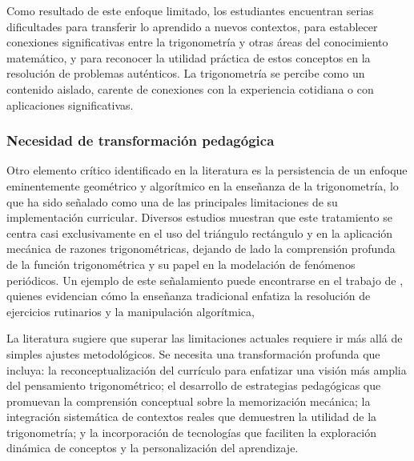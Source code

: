 Como resultado de este enfoque limitado, los estudiantes encuentran serias dificultades para transferir lo aprendido a nuevos contextos, para establecer conexiones significativas entre la trigonometría y otras áreas del conocimiento matemático, y para reconocer la utilidad práctica de estos conceptos en la resolución de problemas auténticos. La trigonometría se percibe como un contenido aislado, carente de conexiones con la experiencia cotidiana o con aplicaciones significativas.

\subsubsection{Necesidad de transformación pedagógica}
Otro elemento crítico identificado en la literatura es la persistencia de un enfoque eminentemente geométrico y algorítmico en la enseñanza de la trigonometría, lo que ha sido señalado como una de las principales limitaciones de su implementación curricular. Diversos estudios muestran que este tratamiento se centra casi exclusivamente en el uso del triángulo rectángulo y en la aplicación mecánica de razones trigonométricas, dejando de lado la comprensión profunda de la función trigonométrica y su papel en la modelación de fenómenos periódicos. Un ejemplo de este señalamiento puede encontrarse en el trabajo de \textcite{chavezEstrategiasDidacticasMediadas2022}, quienes evidencian cómo la enseñanza tradicional enfatiza la resolución de ejercicios rutinarios y la manipulación algorítmica,


La literatura sugiere que superar las limitaciones actuales requiere ir más allá de simples ajustes metodológicos. Se necesita una transformación profunda que incluya: la reconceptualización del currículo para enfatizar una visión más amplia del pensamiento trigonométrico; el desarrollo de estrategias pedagógicas que promuevan la comprensión conceptual sobre la memorización mecánica; la integración sistemática de contextos reales que demuestren la utilidad de la trigonometría; y la incorporación de tecnologías que faciliten la exploración dinámica de conceptos y la personalización del aprendizaje.

